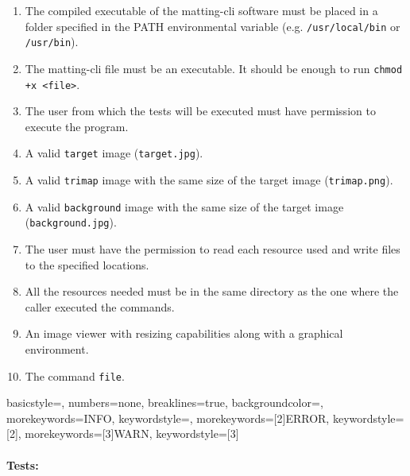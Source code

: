 \documentclass[a4paper]{article}
\begin{document}
\begin{enumerate}
    \item The compiled executable of the matting-cli software
    must be placed in a folder specified in the \textsc{PATH}
    environmental variable (e.g. \texttt{/usr/local/bin} or \texttt{/usr/bin}).
    \item The matting-cli file must be an executable. It should be enough to run
    \lstinline{chmod +x <file>}.
    \item The user from which the tests will be executed must have permission to execute
    the program.
    \item A valid \texttt{target} image (\texttt{target.jpg}).
    \item A valid \texttt{trimap} image with the same size of the target image (\texttt{trimap.png}).
    \item A valid \texttt{background} image with the same size of the target image (\texttt{background.jpg}).
    \item The user must have the permission to read each resource used and write files
    to the specified locations.
    \item All the resources needed must be in the same directory as the one where the caller executed the commands.
    \item An image viewer with resizing capabilities along with a graphical environment.
    \item The command \texttt{file}.
\end{enumerate}

 {
    basicstyle=\ttfamily,
    numbers=none,
    breaklines=true,
    backgroundcolor=\color[gray]{0.97},
    morekeywords={INFO},
    keywordstyle=\color[rgb]{0, 0.75, 0},
    morekeywords=[2]{ERROR},
    keywordstyle=[2]\color[rgb]{0.75, 0, 0},
    morekeywords=[3]{WARN},
    keywordstyle=[3]\color[rgb]{1, 0.5, 0}
}

\newcommand{\moveabit}[1]{\adjustbox{lap={\width}{-0.9cm}}{#1}}

\paragraph{Tests:}
\end{document}
